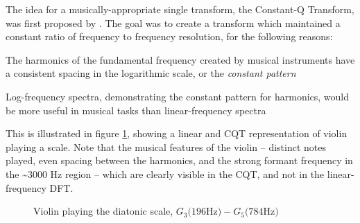 \documentclass[letter,12pt]{article}
\newenvironment{tight_itemize}{
\begin{itemize}
  \setlength{\itemsep}{0pt}
  \setlength{\parskip}{0pt}
}{\end{itemize}}
\begin{document}
The idea for a musically-appropriate single transform, the Constant-Q Transform, was first proposed by \citet{jbrown}. The goal was to create a transform which maintained a constant ratio of frequency to frequency resolution, for the following reasons:

\begin{tight_itemize}
	\item
		The harmonics of the fundamental frequency created by musical instruments have a consistent spacing in the logarithmic scale, or the \textit{constant pattern}
	\item
		Log-frequency spectra, demonstrating the constant pattern for harmonics, would be more useful in musical tasks than linear-frequency spectra
\end{tight_itemize}

This is illustrated in figure \ref{fig:violin}, showing a linear and CQT representation of violin playing a scale. Note that the musical features of the violin -- distinct notes played, even spacing between the harmonics, and the strong formant frequency in the \textasciitilde3000 Hz region -- which are clearly visible in the CQT, and not in the linear-frequency DFT.

\begin{figure}[ht]
	\centering
	\hspace{0.5em}
	\caption{Violin playing the diatonic scale, $G_{3} \text{(196Hz)} - G_{5} \text{(784Hz)}$\cite{jbrown}}
	\label{fig:violin}
\end{figure}
\end{document}
